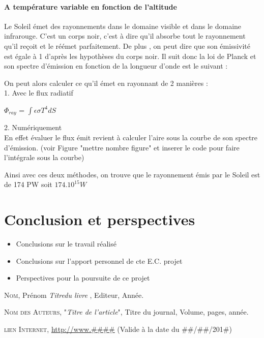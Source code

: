 \documentclass[a4paper, 12pt]{report} %
\begin{document}
\subsubsection{A température variable en fonction de l'altitude}

Le Soleil émet des rayonnements dans le domaine visible et dans le domaine infrarouge. C’est un corps noir, c’est à dire qu’il absorbe tout le rayonnement qu’il reçoit et le réémet parfaitement. De plus , on peut dire que son émissivité est égale à 1 d’après les hypothèses du corps noir. Il suit donc la loi de Planck et son spectre d’émission en fonction de la longueur d’onde est le suivant :


On peut alors calculer ce qu'il émet en rayonnant de 2 manières : \\
1. Avec le flux radiatif
\begin{center}
$\Phi_{ray}$ = $\int \epsilon \sigma T^{4} dS$    
\end{center}
2. Numériquement \\
En effet évaluer le flux émit revient à calculer l'aire sous la courbe 
de son spectre d'émission. (voir Figure  "mettre nombre figure" et inserer 
le code pour faire l'intégrale sous la courbe) \vspace{\baselineskip}

Ainsi avec ces deux méthodes, on trouve que le rayonnement émis par le Soleil 
est de 174 PW  soit $174.10^{15} W$



\chapter*{Conclusion et perspectives}%
\begin{itemize}
\item Conclusions sur le travail réalisé
\item Conclusions sur l'apport personnel de cte E.C. projet
\item Perspectives pour la poursuite de ce projet
\end{itemize}

\begin{thebibliography}{9}

		\textsc{Nom}, Prénom
		\textit{Titredu livre },
		Editeur, Année.

		\textsc{Nom des Auteurs},
		"\textit{Titre de l'article}",
		Titre du journal,
		Volume, pages, année.

\textsc{lien Internet},
		\url{http://www.\#\#\#\#}
		(Valide à la date du \#\#/\#\#/201\#)

\end{thebibliography}
\end{document}
